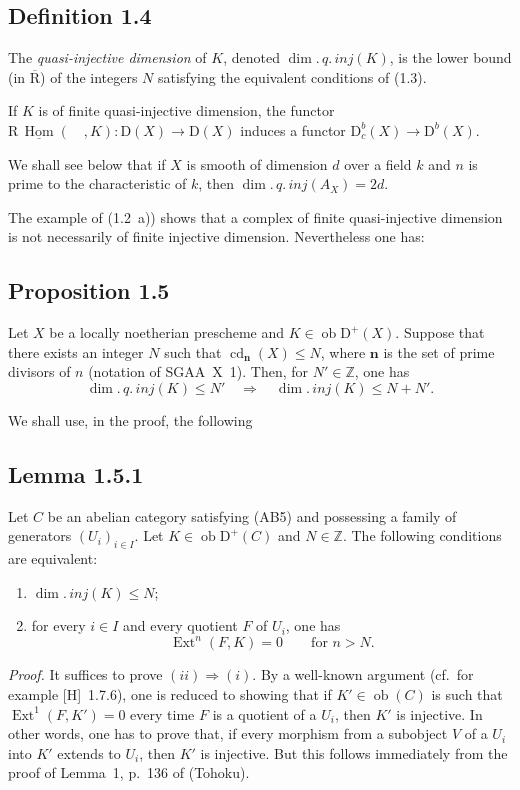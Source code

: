 \documentclass[11pt]{article}
\DeclareMathOperator{\Hom}{Hom}
\DeclareMathOperator{\Ext}{Ext}
\DeclareMathOperator{\cd}{cd}
\newcommand{\R}{\mathrm{R}}
\newcommand{\D}{\mathrm{D}}
\newcommand{\Z}{\mathbb{Z}}
\newcommand{\ob}{\operatorname{ob}}
\providecommand{\Hom}{\operatorname{Hom}}
\providecommand{\ob}{\operatorname{ob}}
\providecommand{\R}{\mathrm R}
\providecommand{\Z}{\mathbb Z}
\begin{document}
\subsection*{Definition 1.4}
The \emph{quasi-injective dimension} of $K$, denoted $\dim.\,q.\,inj(K)$, is the lower bound (in $\overline{\R}$) of the integers $N$ satisfying the equivalent conditions of (1.3).

If $K$ is of finite quasi-injective dimension, the functor $\R\,\underline{\Hom}(\quad,K) : \D(X) \to \D(X)$ induces a functor $\D_c^{b}(X) \to \D^{b}(X)$.

We shall see below that if $X$ is smooth of dimension $d$ over a field $k$ and $n$ is prime to the characteristic of $k$, then $\dim.\,q.\,inj(A_X) = 2d$.

The example of (1.2~a)) shows that a complex of finite quasi-injective dimension is not necessarily of finite injective dimension. Nevertheless one has:

\subsection*{Proposition 1.5}
Let $X$ be a locally noetherian prescheme and $K \in \ob \D^{+}(X)$. Suppose that there exists an integer $N$ such that $\cd_{\mathbf{n}}(X) \leqslant N$, where $\mathbf{n}$ is the set of prime divisors of $n$ (notation of SGAA~X~1). Then, for $N' \in \Z$, one has
\[
\dim.\,q.\,inj(K) \leqslant N' \quad \Longrightarrow \quad \dim.\,inj(K) \leqslant N + N'.
\]

We shall use, in the proof, the following

\subsection*{Lemma 1.5.1}
Let $C$ be an abelian category satisfying (AB5) and possessing a family of generators $(U_i)_{i \in I}$. Let $K \in \ob \D^{+}(C)$ and $N \in \Z$. The following conditions are equivalent:
\begin{enumerate}[label=(\roman*)]
\item $\dim.\,inj(K) \leqslant N$;
\item for every $i \in I$ and every quotient $F$ of $U_i$, one has
\[
\Ext^n(F,K) = 0 \qquad \text{for } n > N.
\]
\end{enumerate}

\emph{Proof.} It suffices to prove $(ii) \Rightarrow (i)$. By a well-known argument (cf.\ for example [H]~1.7.6), one is reduced to showing that if $K' \in \ob(C)$ is such that $\Ext^1(F,K') = 0$ every time $F$ is a quotient of a $U_i$, then $K'$ is injective. In other words, one has to prove that, if every morphism from a subobject $V$ of a $U_i$ into $K'$ extends to $U_i$, then $K'$ is injective. But this follows immediately from the proof of Lemma~1, p.~136 of (Tohoku).
\end{document}
